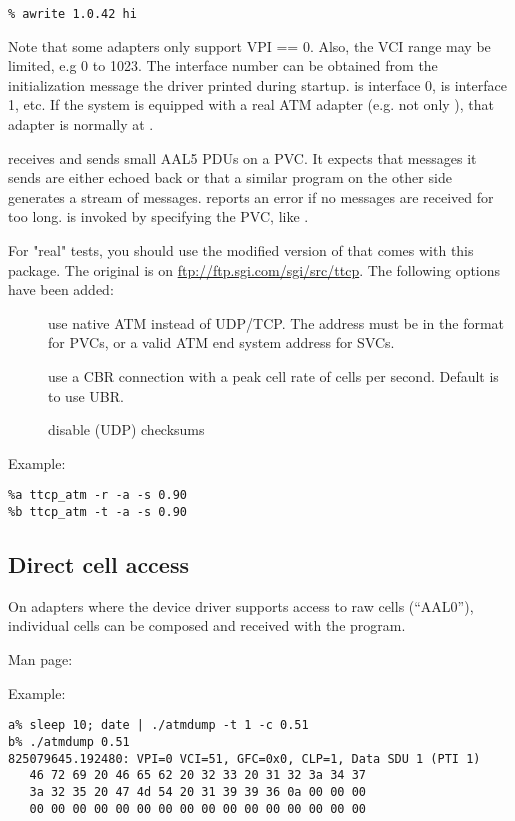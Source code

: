 \begin{verbatim}
% awrite 1.0.42 hi
\end{verbatim}

Note that some adapters only support VPI == 0. Also, the VCI range may be
limited, e.g 0 to 1023.
The interface number can be obtained from the initialization
message the driver printed during startup.  is interface 0,
 is interface 1, etc. If the system is equipped with a real
ATM adapter (e.g. not only ), that adapter is normally at
.

 receives and sends small AAL5 PDUs on a PVC. It expects that
messages it sends are either echoed back or that a similar program on the
other side generates a stream of messages.  reports an error
if no messages are received for too long.  is invoked by
specifying the PVC, like .

For "real" tests, you should use the modified version of  that
comes with this package. The original is on
\url{ftp://ftp.sgi.com/sgi/src/ttcp}. The following options have been added:

\begin{description}
  \item[] use native ATM instead of UDP/TCP. The address must be in
    the format  for PVCs, or a
    valid ATM end system address for SVCs.
  \item[] use a CBR connection with a peak cell rate of
     cells per second. Default is to use UBR.
  \item[] disable (UDP) checksums
\end{description}

Example:
\begin{verbatim}
%a ttcp_atm -r -a -s 0.90
%b ttcp_atm -t -a -s 0.90
\end{verbatim}


\subsection{Direct cell access}

On adapters where the device driver supports access to raw cells (``AAL0''),
individual cells can be composed and received with the  program.

Man page: 

Example:
{\footnotesize
\begin{verbatim}
a% sleep 10; date | ./atmdump -t 1 -c 0.51
b% ./atmdump 0.51
825079645.192480: VPI=0 VCI=51, GFC=0x0, CLP=1, Data SDU 1 (PTI 1)
   46 72 69 20 46 65 62 20 32 33 20 31 32 3a 34 37 
   3a 32 35 20 47 4d 54 20 31 39 39 36 0a 00 00 00 
   00 00 00 00 00 00 00 00 00 00 00 00 00 00 00 00 
\end{verbatim}}


